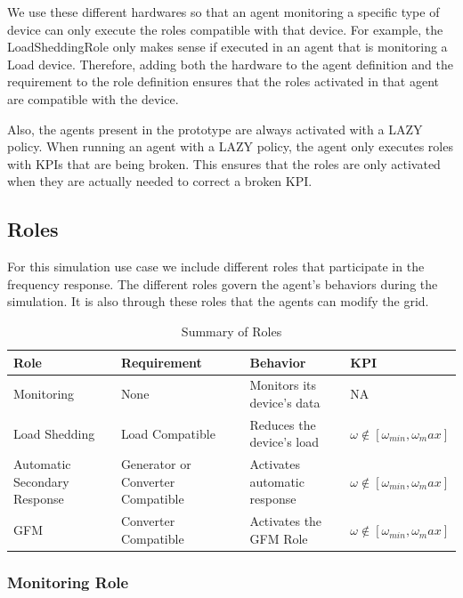 \documentclass{article}
\begin{document}
We use these different hardwares so that an agent monitoring a specific type of device can only execute the roles compatible with that device. For example, the LoadSheddingRole only makes sense if executed in an agent that is monitoring a Load device. Therefore, adding both the hardware to the agent definition and the requirement to the role definition ensures that the roles activated in that agent are compatible with the device.

Also, the agents present in the prototype are always activated with a LAZY policy. When running an agent with a LAZY policy, the agent only executes roles with KPIs that are being broken. This ensures that the roles are only activated when they are actually needed to correct a broken KPI. 

\subsection{Roles}

For this simulation use case we include different roles that participate in the frequency response. The different roles govern the agent's behaviors during the simulation. It is also through these roles that the agents can modify the grid.  

\begin{table}[h]
    \centering
    \small %
    \renewcommand{\arraystretch}{1.2} %
    \begin{tabular}{|p{3cm}|p{3cm}|p{4cm}|p{4cm}|} %
    \hline
    Role & Requirement & Behavior & KPI \\
    \hline
    Monitoring & None & Monitors its device's data & NA\\
    Load Shedding & Load Compatible & Reduces the device's load & $\omega \notin [\omega_{min},  \omega_max]$\\
    Automatic Secondary Response & Generator or Converter Compatible& Activates automatic response & $\omega \notin [\omega_{min},  \omega_max]$\\
    GFM & Converter Compatible & Activates the GFM Role & $\omega \notin [\omega_{min},  \omega_max]$\\
    \hline
    \end{tabular}
    \caption{Summary of Roles}
    \label{tab:roles}
\end{table}

\subsubsection*{Monitoring Role}
\end{document}
